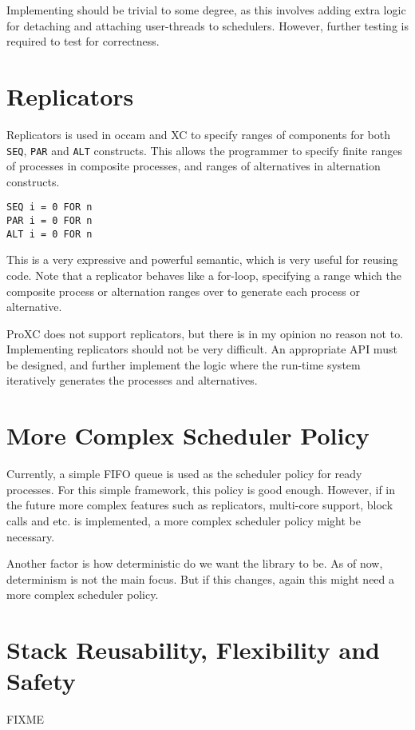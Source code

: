 Implementing should be trivial to some degree, as this involves adding extra logic for detaching and attaching user\hyp{}threads to schedulers. However, further testing is required to test for correctness.

\section{Replicators}

Replicators is used in occam and XC to specify ranges of components for both \texttt{SEQ}, \texttt{PAR} and \texttt{ALT} constructs. This allows the programmer to specify finite ranges of processes in composite processes, and ranges of alternatives in alternation constructs. 

\begin{lstlisting}[style={CustomC},frame={},numbers={none}]
SEQ i = 0 FOR n
PAR i = 0 FOR n
ALT i = 0 FOR n
\end{lstlisting}

This is a very expressive and powerful semantic, which is very useful for reusing code. Note that a replicator behaves like a for\hyp{}loop, specifying a range which the composite process or alternation ranges over to generate each process or alternative. 

ProXC does not support replicators, but there is in my opinion no reason not to. Implementing replicators should not be very difficult. An appropriate API must be designed, and further implement the logic where the run\hyp{}time system iteratively generates the processes and alternatives.

\section{More Complex Scheduler Policy}

Currently, a simple FIFO queue is used as the scheduler policy for ready processes. For this simple framework, this policy is good enough. However, if in the future more complex features such as replicators, multi\hyp{}core support, block calls and etc. is implemented, a more complex scheduler policy might be necessary. 

Another factor is how deterministic do we want the library to be. As of now, determinism is not the main focus. But if this changes, again this might need a more complex scheduler policy. 

\section{Stack Reusability, Flexibility and Safety}

FIXME
